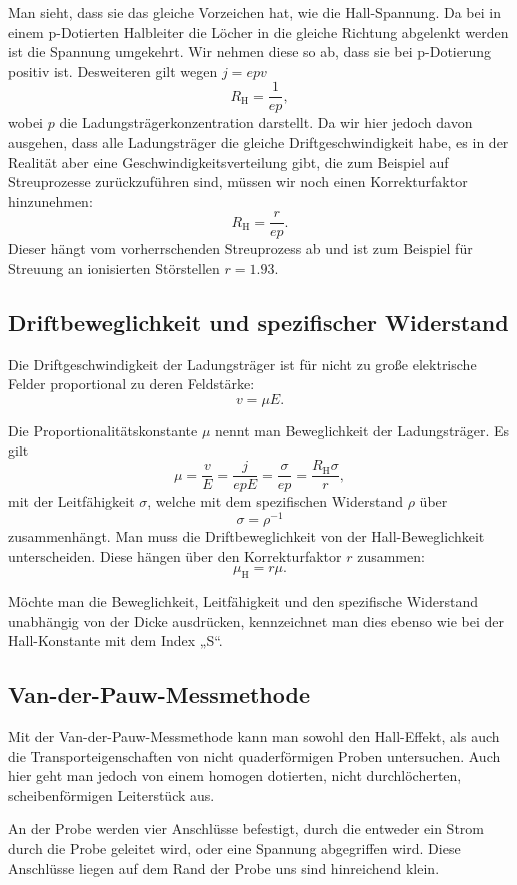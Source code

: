 Man sieht, dass sie das gleiche Vorzeichen hat, wie die Hall-Spannung.
Da bei in einem p-Dotierten Halbleiter die Löcher in die gleiche
Richtung abgelenkt werden ist die Spannung umgekehrt. Wir nehmen diese
so ab, dass sie bei p-Dotierung positiv ist.
Desweiteren gilt wegen $j=epv$
\[
    R_\text{H} = \frac{1}{ep},
\]
wobei $p$ die Ladungsträgerkonzentration darstellt. Da wir hier jedoch
davon ausgehen, dass alle Ladungsträger die gleiche
Driftgeschwindigkeit habe, es in der Realität aber eine
Geschwindigkeitsverteilung gibt, die zum Beispiel auf Streuprozesse
zurückzuführen sind, müssen wir noch einen Korrekturfaktor hinzunehmen:
\[
    R_\text{H} = \frac{r}{ep}.
\]
Dieser hängt vom vorherrschenden Streuprozess ab und ist zum Beispiel für
Streuung an ionisierten Störstellen $r = \num{1.93}$.

\subsection{Driftbeweglichkeit und spezifischer Widerstand}

Die Driftgeschwindigkeit der Ladungsträger ist für nicht zu große elektrische
Felder proportional zu deren Feldstärke:
\[
    v = \mu E.
\]

Die Proportionalitätskonstante $\mu$ nennt man Beweglichkeit der
Ladungsträger. Es gilt
\[
    \mu = \frac{v}{E} = \frac{j}{epE} = \frac{\sigma}{ep} =
    \frac{R_\text{H}\sigma}{r},
\]
mit der Leitfähigkeit $\sigma$, welche mit dem spezifischen Widerstand
$\rho$ über
\[
    \sigma = \rho^{-1}
\]
zusammenhängt. Man muss die Driftbeweglichkeit von der
Hall-Beweglichkeit unterscheiden. Diese hängen über den Korrekturfaktor
$r$ zusammen:
\[
    \mu_\text{H} = r\mu.
\]

Möchte man die Beweglichkeit, Leitfähigkeit und den spezifische Widerstand
unabhängig von der Dicke ausdrücken, kennzeichnet man dies ebenso wie bei der
Hall-Konstante mit dem Index „S“.

\subsection{Van-der-Pauw-Messmethode}

Mit der Van-der-Pauw-Messmethode kann man sowohl den Hall-Effekt, als auch die
Transporteigenschaften von nicht quaderförmigen Proben untersuchen. Auch hier
geht man jedoch von einem homogen dotierten, nicht durchlöcherten,
scheibenförmigen Leiterstück aus.

An der Probe werden vier Anschlüsse befestigt, durch die entweder ein Strom
durch die Probe geleitet wird, oder eine Spannung abgegriffen wird. Diese
Anschlüsse liegen auf dem Rand der Probe uns sind hinreichend klein.


